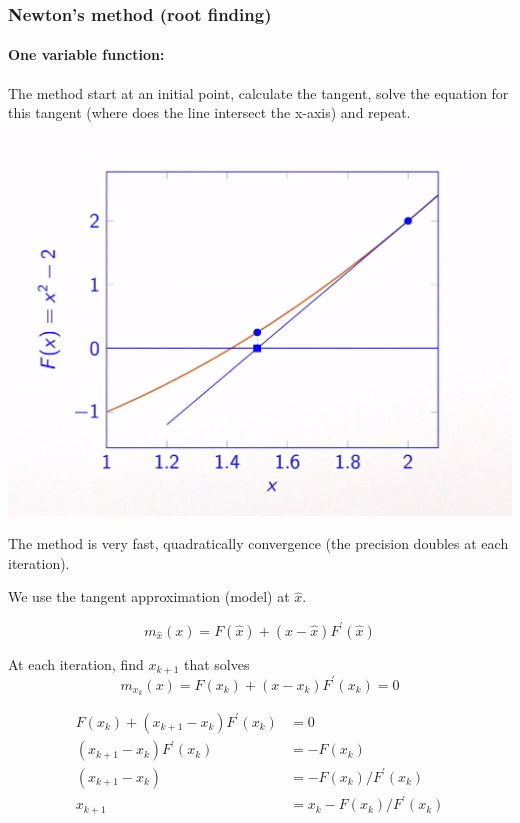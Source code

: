 \subsubsection{Newton's method (root finding)}
\paragraph{One variable function:}
The method start at an initial point, calculate the tangent, solve the equation for this tangent (where does the line intersect the x-axis) and repeat.

\includegraphics[width=\linewidth]{content/newton_root_finding.png}


The method is very fast, quadratically convergence (the precision doubles at each iteration).

We use the tangent approximation (model) at $\hat{x}$.

\begin{equation}
    m_{\hat{x}}(x)=F(\hat{x}) + (x-\hat{x}) F^{\prime}(\hat{x})
\end{equation}

At each iteration, find $x_{k+1}$ that solves
\begin{equation}
    m_{x_k}(x) = F(x_k) + (x-x_k)F^{\prime}(x_k) = 0
\end{equation}

\begin{equation}
    \begin{split}
        F(x_k)+(x_{k+1}-x_k)F^{\prime}(x_k) &= 0 \\
        (x_{k+1}-x_k)F^{\prime}(x_k) &= -F(x_k) \\
        (x_{k+1}-x_k) &= -F(x_k) / F^{\prime}(x_k) \\
        x_{k+1} &= x_k - F(x_k) / F^{\prime}(x_k)
    \end{split}
\end{equation}

